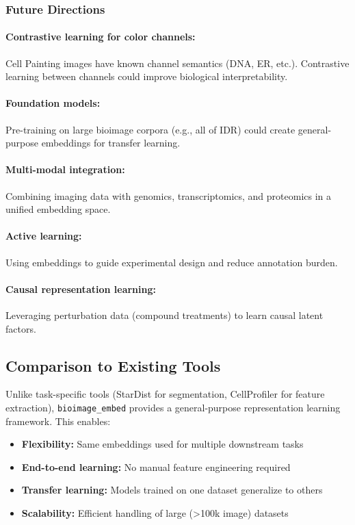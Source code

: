 \subsubsection{Future Directions}

\paragraph{Contrastive learning for color channels:} Cell Painting images have known channel semantics (DNA, ER, etc.). Contrastive learning between channels could improve biological interpretability.

\paragraph{Foundation models:} Pre-training on large bioimage corpora (e.g., all of IDR) could create general-purpose embeddings for transfer learning.

\paragraph{Multi-modal integration:} Combining imaging data with genomics, transcriptomics, and proteomics in a unified embedding space.

\paragraph{Active learning:} Using embeddings to guide experimental design and reduce annotation burden.

\paragraph{Causal representation learning:} Leveraging perturbation data (compound treatments) to learn causal latent factors.

\subsection{Comparison to Existing Tools}

Unlike task-specific tools (StarDist for segmentation, CellProfiler for feature extraction), \texttt{bioimage\_embed} provides a general-purpose representation learning framework. This enables:

\begin{itemize}
    \item \textbf{Flexibility:} Same embeddings used for multiple downstream tasks
    \item \textbf{End-to-end learning:} No manual feature engineering required
    \item \textbf{Transfer learning:} Models trained on one dataset generalize to others
    \item \textbf{Scalability:} Efficient handling of large (>100k image) datasets
\end{itemize}

